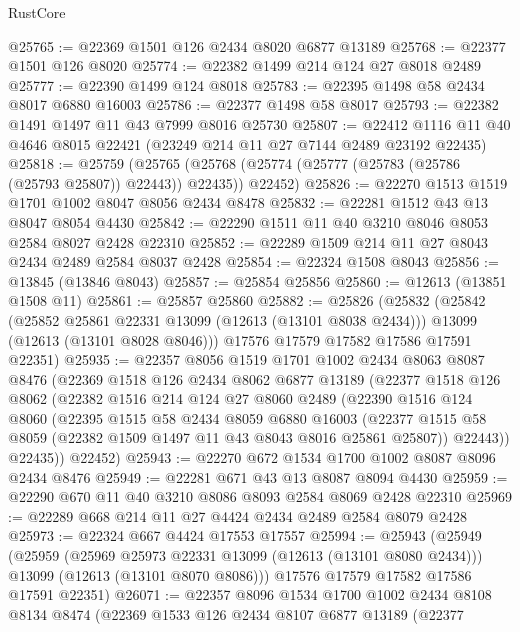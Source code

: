 \begin{lexlean}{RustCore}
\begin{coremodule}
@25765 := @22369 @1501 @126 @2434 @8020 @6877 @13189
@25768 := @22377 @1501 @126 @8020
@25774 := @22382 @1499 @214 @124 @27 @8018 @2489
@25777 := @22390 @1499 @124 @8018
@25783 := @22395 @1498 @58 @2434 @8017 @6880 @16003
@25786 := @22377 @1498 @58 @8017
@25793 := @22382 @1491 @1497 @11 @43 @7999 @8016 @25730
@25807 := @22412 @1116 @11 @40 @4646 @8015 @22421 (@23249 @214 @11 @27 @7144 @2489 @23192 @22435)
@25818 := @25759
    (@25765 (@25768 (@25774 (@25777 (@25783 (@25786 (@25793 @25807)) @22443)) @22435)) @22452)
@25826 := @22270 @1513 @1519 @1701 @1002 @8047 @8056 @2434 @8478
@25832 := @22281 @1512 @43 @13 @8047 @8054 @4430
@25842 := @22290 @1511 @11 @40 @3210 @8046 @8053 @2584 @8027 @2428 @22310
@25852 := @22289 @1509 @214 @11 @27 @8043 @2434 @2489 @2584 @8037 @2428
@25854 := @22324 @1508 @8043
@25856 := @13845 (@13846 @8043)
@25857 := @25854 @25856
@25860 := @12613 (@13851 @1508 @11)
@25861 := @25857 @25860
@25882 := @25826
    (@25832
      (@25842
        (@25852 @25861 @22331 @13099 (@12613 (@13101 @8038 @2434)))
        @13099
        (@12613 (@13101 @8028 @8046)))
      @17576
      @17579
      @17582
      @17586
      @17591
      @22351)
@25935 := @22357
    @8056
    @1519
    @1701
    @1002
    @2434
    @8063
    @8087
    @8476
    (@22369
      @1518
      @126
      @2434
      @8062
      @6877
      @13189
      (@22377
        @1518
        @126
        @8062
        (@22382
          @1516
          @214
          @124
          @27
          @8060
          @2489
          (@22390
            @1516
            @124
            @8060
            (@22395
              @1515
              @58
              @2434
              @8059
              @6880
              @16003
              (@22377 @1515 @58 @8059 (@22382 @1509 @1497 @11 @43 @8043 @8016 @25861 @25807))
              @22443))
          @22435))
      @22452)
@25943 := @22270 @672 @1534 @1700 @1002 @8087 @8096 @2434 @8476
@25949 := @22281 @671 @43 @13 @8087 @8094 @4430
@25959 := @22290 @670 @11 @40 @3210 @8086 @8093 @2584 @8069 @2428 @22310
@25969 := @22289 @668 @214 @11 @27 @4424 @2434 @2489 @2584 @8079 @2428
@25973 := @22324 @667 @4424 @17553 @17557
@25994 := @25943
    (@25949
      (@25959
        (@25969 @25973 @22331 @13099 (@12613 (@13101 @8080 @2434)))
        @13099
        (@12613 (@13101 @8070 @8086)))
      @17576
      @17579
      @17582
      @17586
      @17591
      @22351)
@26071 := @22357
    @8096
    @1534
    @1700
    @1002
    @2434
    @8108
    @8134
    @8474
    (@22369
      @1533
      @126
      @2434
      @8107
      @6877
      @13189
      (@22377

\end{coremodule}
\end{lexlean}
